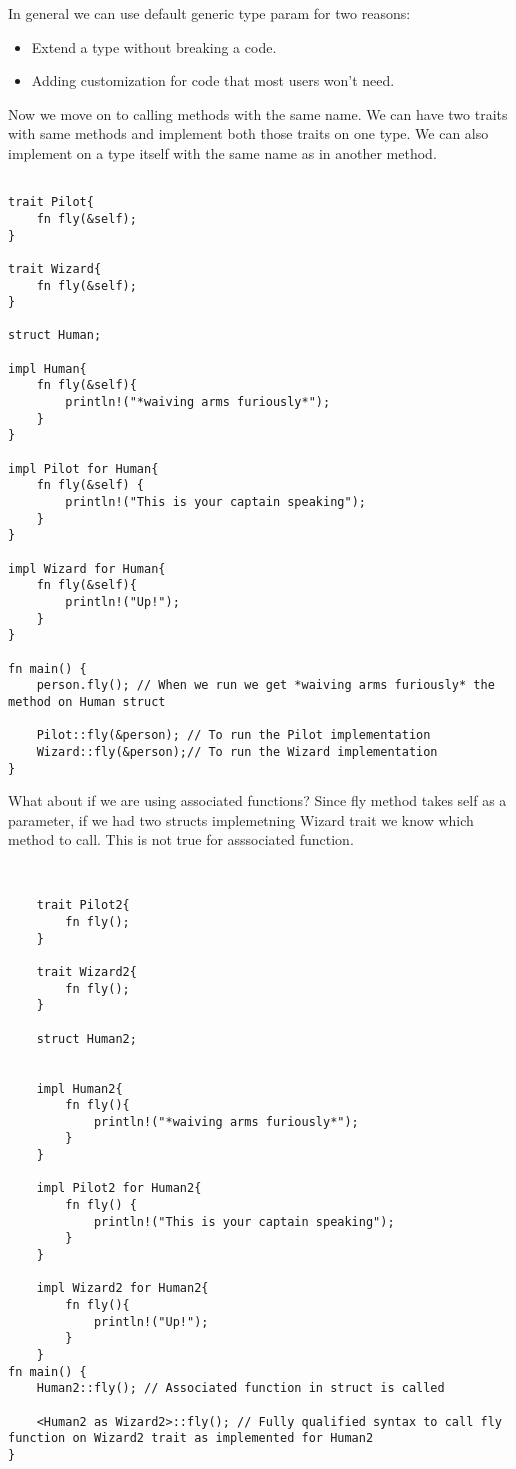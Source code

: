 In general we can use default generic type param for two reasons:\begin{itemize}
    \item Extend a type without breaking a code.
    \item Adding customization for code that most users won't need.  
\end{itemize}
    

Now we move on to calling methods with the same name. We can have two traits with same methods and implement both those traits on one type. We can also implement on a type itself with the same name as in another method.

\newpage

\begin{lstlisting}
    
trait Pilot{
    fn fly(&self);
}

trait Wizard{
    fn fly(&self);
}

struct Human;

impl Human{
    fn fly(&self){
        println!("*waiving arms furiously*");
    }
}

impl Pilot for Human{
    fn fly(&self) {
        println!("This is your captain speaking");
    }
}

impl Wizard for Human{
    fn fly(&self){
        println!("Up!");
    }
}

fn main() {
    person.fly(); // When we run we get *waiving arms furiously* the method on Human struct

    Pilot::fly(&person); // To run the Pilot implementation
    Wizard::fly(&person);// To run the Wizard implementation
}
\end{lstlisting}

What about if we are using associated functions? Since fly method takes self as a parameter, if we had two structs implemetning Wizard trait we know which method to call. This is not true for asssociated function.


\newpage

\begin{lstlisting}
    

    trait Pilot2{
        fn fly();
    }
    
    trait Wizard2{
        fn fly();
    }
    
    struct Human2;

    
    impl Human2{
        fn fly(){
            println!("*waiving arms furiously*");
        }
    }
    
    impl Pilot2 for Human2{
        fn fly() {
            println!("This is your captain speaking");
        }
    }
    
    impl Wizard2 for Human2{
        fn fly(){
            println!("Up!");
        }
    }
fn main() {
    Human2::fly(); // Associated function in struct is called

    <Human2 as Wizard2>::fly(); // Fully qualified syntax to call fly function on Wizard2 trait as implemented for Human2 
}
\end{lstlisting}

